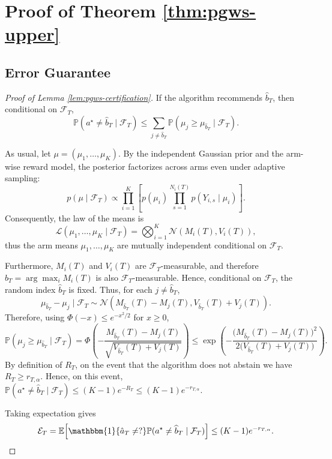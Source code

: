 \documentclass[10pt]{article}
\theoremstyle{plain}
\begin{document}
\section{Proof of Theorem \ref{thm:pgws-upper}} \label{app:pgws-analysis}

\subsection{Error Guarantee}

\begin{proof}[Proof of Lemma \ref{lem:pgws-certification}]
If the algorithm recommends $\widehat b_T$, then conditional on $\mathcal F_T$,
\[
\mathbb P(a^\star\neq \widehat b_T\mid \mathcal F_T)
\le
\sum_{j\neq \widehat b_T}
\mathbb P(\mu_j\ge \mu_{\widehat b_T}\mid \mathcal F_T).
\]


As usual, let \(\mu=(\mu_1,\dots,\mu_K)\). By the independent Gaussian prior and the arm-wise reward model, the posterior factorizes across arms even under adaptive sampling:
\[
p(\mu\mid\mathcal F_T)
\propto
\prod_{i=1}^K
\left[
p(\mu_i)
\prod_{s=1}^{N_i(T)}
p(Y_{i,s}\mid \mu_i)
\right].
\]
Consequently, the law of the means is
\[
\mathcal L(\mu_1,\dots,\mu_K\mid\mathcal F_T)
=
\bigotimes_{i=1}^K \mathcal N(M_i(T),V_i(T)),
\]
thus the arm means \(\mu_1,\dots,\mu_K\) are mutually independent conditional on
\(\mathcal F_T\).

Furthermore, \(M_i(T)\) and \(V_i(T)\) are \(\mathcal F_T\)-measurable, and therefore
$\widehat b_T=\arg\max_i M_i(T)$
is also \(\mathcal F_T\)-measurable. Hence,  conditional on \(\mathcal F_T\), the random index
\(\widehat b_T\) is fixed. Thus, for each \(j\neq \widehat b_T\),
\[
\mu_{\widehat b_T}-\mu_j\mid\mathcal F_T
\sim
\mathcal N\!\left(
M_{\widehat b_T}(T)-M_j(T),
V_{\widehat b_T}(T)+V_j(T)
\right).
\]
Therefore, using $\Phi(-x)\le e^{-x^2/2}$ for $x\ge0$,
\[
\mathbb P(\mu_j\ge\mu_{\widehat b_T}\mid\mathcal F_T)
=
\Phi\left(
-\frac{M_{\widehat b_T}(T)-M_j(T)}
{\sqrt{V_{\widehat b_T}(T)+V_j(T)}}
\right)
\le
\exp\left(
-\frac{
\bigl(M_{\widehat b_T}(T)-M_j(T)\bigr)^2
}{
2\bigl(V_{\widehat b_T}(T)+V_j(T)\bigr)
}
\right).
\]
By definition of $R_T$, on the event that the algorithm does not abstain we have
$R_T\ge r_{T,\alpha}$. Hence, on this event,
$
\mathbb P(a^\star\neq \widehat b_T\mid\mathcal F_T)
\le
(K-1)e^{-R_T}
\le
(K-1)e^{-r_{T,\alpha}}.
$

Taking expectation gives
\[
\mathcal E_T
=
\mathbb E\!\left[
\mathbbm{1}\{\hat a_T\neq ?\}
\mathbb P(a^\star\neq \widehat b_T\mid\mathcal F_T)
\right]
\le
(K-1)e^{-r_{T,\alpha}}.  
\]
\end{proof}
\end{document}

